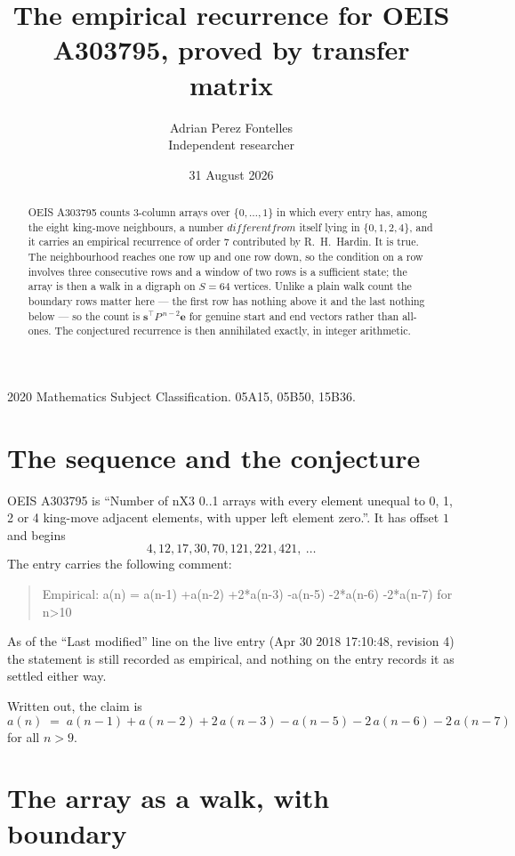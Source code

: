 \documentclass[11pt,a4paper]{article}
\title{The empirical recurrence for OEIS A303795, proved by transfer matrix}
\author{Adrian Perez Fontelles\\ \small Independent researcher}
\date{31 August 2026}
\theoremstyle{plain}
\theoremstyle{definition}
\begin{document}
\maketitle

\begin{abstract}
OEIS A303795 counts $3$-column arrays over $\{0,\dots,1\}$ in which every entry has,
among the eight king-move neighbours, a number $different from$ itself lying in $\{0,1,2,4\}$, and it carries an empirical
recurrence of order $7$ contributed by R.~H.~Hardin. It is true. The neighbourhood
reaches one row up and one row down, so the condition on a row involves three consecutive
rows and a window of two rows is a sufficient state; the array is then a walk in a digraph
on $S=64$ vertices. Unlike a plain walk count the boundary rows matter here --- the first
row has nothing above it and the last nothing below --- so the count is
$\mathbf{s}^{\!\top}P^{\,n-2}\mathbf{e}$ for genuine start and end vectors rather than
all-ones. The conjectured recurrence is then annihilated exactly, in integer arithmetic.
\end{abstract}

\noindent\small 2020 Mathematics Subject Classification. 05A15, 05B50, 15B36.\normalsize

\section{The sequence and the conjecture}

OEIS A303795 is ``Number of nX3 0..1 arrays with every element unequal to 0, 1, 2 or 4 king-move adjacent elements, with upper left element zero.''. It has offset
$1$ and begins
\[
4, 12, 17, 30, 70, 121, 221, 421,\ \dots
\]
The entry carries the following comment:
\begin{quote}\small
Empirical: a(n) = a(n-1) +a(n-2) +2*a(n-3) -a(n-5) -2*a(n-6) -2*a(n-7) for n>10
\end{quote}
As of the ``Last modified'' line on the live entry (Apr 30 2018 17:10:48, revision
4) the statement is still recorded as empirical, and nothing on the entry
records it as settled either way.

Written out, the claim is
\begin{equation}\label{eq:conj}
a(n)\;=\;a(n-1) + a(n-2) + 2\,a(n-3) - a(n-5) - 2\,a(n-6) - 2\,a(n-7)
\end{equation}
for all $n>9$.

\section{The array as a walk, with boundary}
\end{document}
